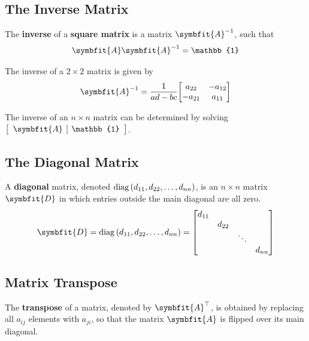 \documentclass{article}
\begin{document}
	\subsection{The Inverse Matrix}
	\begin{definition}
		The \textbf{inverse} of a \textbf{square matrix} is a matrix $\symbfit{A}^{-1}$, such that
		\begin{equation*}
			\symbfit{A} \symbfit{A}^{-1} = \mathbb{1}
		\end{equation*}
	\end{definition}
	\begin{theorem}
		The inverse of a $2\times 2$ matrix is given by
		\begin{equation*}
			\symbfit{A}^{-1} = \frac{1}{ad-bc}
			\mqty[
				a_{22}  & -a_{12} \\
				-a_{21} & a_{11}
			]
		\end{equation*}
	\end{theorem}
	\begin{theorem}
		The inverse of an $n\times n$ matrix can be determined by solving $\left[\begin{array}{c|c} \symbfit{A} & \mathbb{1} \end{array}\right]$.
	\end{theorem}
	\subsection{The Diagonal Matrix}
	\begin{definition}
		A \textbf{diagonal} matrix, denoted $\operatorname{diag}{\left( d_{11}, d_{22}, \ldots, d_{nn} \right)}$, is an $n \times n$ matrix $\symbfit{D}$ in which entries outside the main diagonal are all zero. 
		\begin{equation*}
			\symbfit{D} = \diag{\left( d_{11}, d_{22}, \ldots, d_{nn} \right)}
			=\mqty[
				d_{11} &        &        & \\
				       & d_{22} &        & \\
					   &        & \ddots & \\
					   &        &        & d_{nn}
			]
		\end{equation*}
	\end{definition}
	\subsection{Matrix Transpose}
	\begin{definition}
		The \textbf{transpose} of a matrix, denoted by $\symbfit{A}^\top$, is obtained by replacing all $a_{ij}$ elements with $a_{ji}$, so that the matrix $\symbfit{A}$ is flipped over its main diagonal.
	\end{definition}
\end{document}
